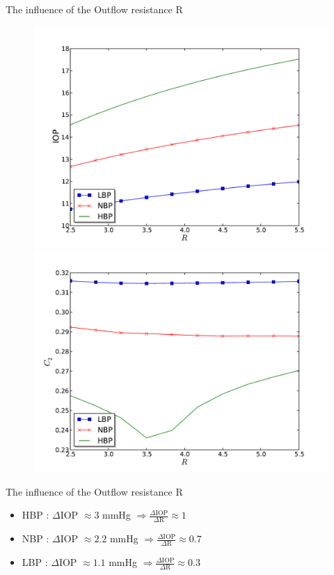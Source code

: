\begin{frame}{The influence of the Outflow resistance R}
\begin{figure}[H]
\begin{minipage}{0.45\linewidth}
\includegraphics[scale=0.27]{images/IOP_R}
\end{minipage}\hfill
\begin{minipage}{0.45\linewidth}
\includegraphics[scale=0.27]{images/C2_R}
\end{minipage}
\end{figure}
\end{frame}
\begin{frame}{The influence of the Outflow resistance R}
\begin{itemize}
\item \alert{HBP }: $\Delta$IOP $\approx 3$ mmHg
$\Rightarrow\frac{\Delta \mathrm{IOP}}{\Delta \mathrm{R}} \approx 1$
\medskip

\item \alert{NBP }: $\Delta$IOP $\approx 2.2$ mmHg
$\Rightarrow
\frac{\Delta \mathrm{IOP}}{\Delta \mathrm{R}} \approx 0.7$
\medskip
\item \alert{LBP }: $\Delta$IOP $\approx 1.1$ mmHg
$\Rightarrow
\frac{\Delta \mathrm{IOP}}{\Delta \mathrm{R}} \approx 0.3$
\end{itemize}
\bigskip
{}
\end{frame}
